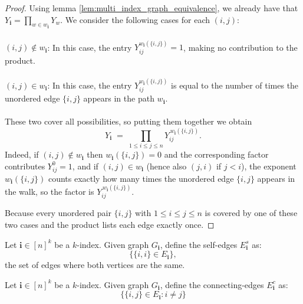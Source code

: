 \begin{proof}
\notready
Using lemma \ref{lem:multi_index_graph_equivalence}, we already have that $Y_{\mathbf{i}} = \prod_{w \in w_{\mathbf{i}}} Y_{w}$. We consider the following cases for each $(i, j)$:\\\\
\textbf{$(i, j) \notin w_{\mathbf{i}}$}: In this case, the entry $Y_{ij}^{w_{\mathbf{i}}(\{i, j\})} = 1$, making no contribution to the product. \\\\
\textbf{$(i, j) \in w_{\mathbf{i}}$}: In this case, the entry $Y_{ij}^{w_{\mathbf{i}}(\{i, j\})}$ is equal to the number of times the unordered edge $\{i, j\}$ appears in the path $w_{\mathbf{i}}$. \\\\
These two cover all possibilities, so putting them together we obtain
$$
Y_{\mathbf i}
      \;=\;
      \prod_{1\le i\le j\le n}
          Y_{ij}^{\,w_{\mathbf i}(\{i,j\})}.
$$
Indeed, if $(i,j)\notin w_{\mathbf i}$ then $w_{\mathbf i}(\{i,j\})=0$ and the corresponding factor contributes $Y_{ij}^{0}=1$, and if $(i,j)\in w_{\mathbf i}$ (hence also $(j,i)$ if $j<i$), the exponent $w_{\mathbf i}(\{i,j\})$ counts exactly how many times the unordered edge $\{i,j\}$ appears in the walk, so the factor is $Y_{ij}^{\,w_{\mathbf i}(\{i,j\})}$.

Because every unordered pair $\{i,j\}$ with $1\le i\le j\le n$ is covered by one of these two cases and the product lists each edge exactly once.
\end{proof}

\begin{definition}
    \label{def:graph_self_edges}
    \notready
    Let $\mathbf{i} \in[n]^k$ be a $k$-index. Given graph $G_{\mathbf{i}}$, define the self-edges $E_{\mathbf{i}}^{s}$ as:
    $$
    \{\{i, i\} \in E_{\mathbf{i}}\},
    $$
    the set of edges where both vertices are the same.
\end{definition}

\begin{definition}
    \label{def:graph_connecting_edges}
    \notready
    Let $\mathbf{i} \in[n]^k$ be a $k$-index. Given graph $G_{\mathbf{i}}$, define the connecting-edges $E_{\mathbf{i}}^{c}$ as:
    $$
    \{\{i, j\} \in E_{\mathbf{i}} : i \neq j\}
    $$
\end{definition}

